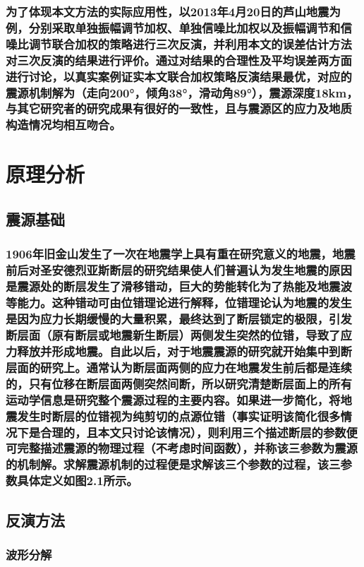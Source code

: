 \documentclass[a4paper,12pt,single,pdftex]{scrartcl}
\begin{document}
\label{ID_1381199343}\subsubsection{为了体现本文方法的实际应用性，以2013年4月20日的芦山地震为例，分别采取单独振幅调节加权、单独信噪比加权以及振幅调节和信噪比调节联合加权的策略进行三次反演，并利用本文的误差估计方法对三次反演的结果进行评价。通过对结果的合理性及平均误差两方面进行讨论，以真实案例证实本文联合加权策略反演结果最优，对应的震源机制解为（走向200°，倾角38°，滑动角89°），震源深度18km，与其它研究者的研究成果有很好的一致性，且与震源区的应力及地质构造情况均相互吻合。}

\label{ID_64212303}\section{原理分析}

\label{ID_67382634}\subsection{震源基础}

\label{ID_72470361}\subsubsection{1906年旧金山发生了一次在地震学上具有重在研究意义的地震，地震前后对圣安德烈亚斯断层的研究结果\cite{Milne1910}使人们普遍认为发生地震的原因是震源处的断层发生了滑移错动，巨大的势能转化为了热能及地震波等能力。这种错动可由位错理论进行解释，位错理论认为地震的发生是因为应力长期缓慢的大量积累，最终达到了断层锁定的极限，引发断层面（原有断层或地震新生断层）两侧发生突然的位错，导致了应力释放并形成地震。自此以后，对于地震震源的研究就开始集中到断层面的研究上。通常认为断层面两侧的应力在地震发生前后都是连续的，只有位移在断层面两侧突然间断，所以研究清楚断层面上的所有运动学信息是研究整个震源过程的主要内容。如果进一步简化，将地震发生时断层的位错视为纯剪切的点源位错（事实证明该简化很多情况下是合理的，且本文只讨论该情况），则利用三个描述断层的参数便可完整描述震源的物理过程（不考虑时间函数），并称该三参数为震源的机制解。求解震源机制的过程便是求解该三个参数的过程，该三参数具体定义如图2.1所示\citep{程万正2006}。}

\label{ID_1219588045}\subsection{反演方法}

\label{ID_1243921566}\subsubsection{波形分解}
\end{document}
